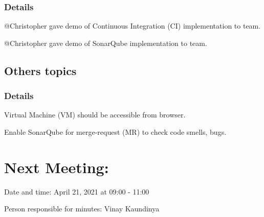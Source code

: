 \documentclass[11pt]{meetingmins} %
\begin{document}
\subsubsection{Details}
\begin{hiddensubitems}
    \item @Christopher gave demo of Continuous Integration (CI) implementation to team.
    \item @Christopher gave demo of SonarQube implementation to team. 
\end{hiddensubitems}

\subsection{Others topics}
\subsubsection{Details}
\begin{hiddensubitems}
    \item Virtual Machine (VM) should be accessible from browser.
    \item Enable SonarQube for merge-request (MR) to check code smells, bugs.  
\end{hiddensubitems}

\section{Next Meeting:}
\begin{hiddensubitems}
    \item Date and time: April 21, 2021 at 09:00 - 11:00
    \item Person responsible for minutes: Vinay Kaundinya
\end{hiddensubitems}
\end{document}

